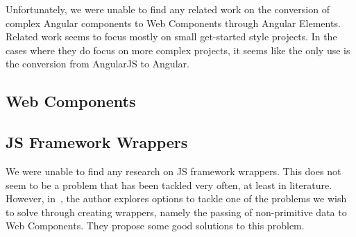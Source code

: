 Unfortunately, we were unable to find any related work on the conversion of complex Angular components to Web Components through Angular Elements. Related work seems to focus mostly on small get-started style projects. In the cases where they do focus on more complex projects, it seems like the only use is the conversion from AngularJS to Angular.

\subsection{Web Components}

\subsection{JS Framework Wrappers}
We were unable to find any research on JS framework wrappers. This does not seem to be a problem that has been tackled very often, at least in literature. However, in~\cite{remdt_2019}, the author explores options to tackle one of the problems we wish to solve through creating wrappers, namely the passing of non-primitive data to Web Components. They propose some good solutions to this problem.
